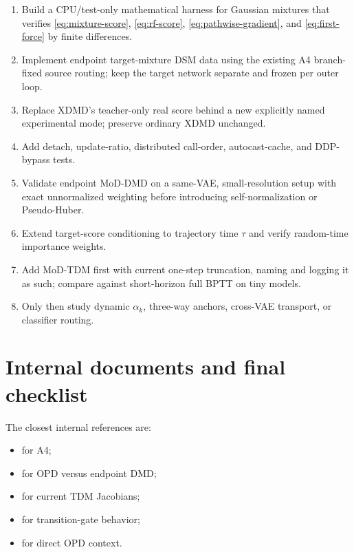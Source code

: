 \documentclass[11pt,a4paper]{article}
\theoremstyle{plain}
\theoremstyle{definition}
\begin{document}
\begin{enumerate}[leftmargin=1.6em]
\item Build a CPU/test-only mathematical harness for Gaussian mixtures that verifies
      \eqref{eq:mixture-score}, \eqref{eq:rf-score}, \eqref{eq:pathwise-gradient}, and
      \eqref{eq:first-force} by finite differences.
\item Implement endpoint target-mixture DSM data using the existing A4 branch-fixed source
      routing; keep the target network separate and frozen per outer loop.
\item Replace XDMD's teacher-only real score behind a new explicitly named experimental mode;
      preserve ordinary XDMD unchanged.
\item Add detach, update-ratio, distributed call-order, autocast-cache, and DDP-bypass tests.
\item Validate endpoint MoD-DMD on a same-VAE, small-resolution setup with exact unnormalized
      weighting before introducing self-normalization or Pseudo-Huber.
\item Extend target-score conditioning to trajectory time $\tau$ and verify random-time importance
      weights.
\item Add MoD-TDM first with current one-step truncation, naming and logging it as such; compare
      against short-horizon full BPTT on tiny models.
\item Only then study dynamic $\alpha_k$, three-way anchors, cross-VAE transport, or classifier
      routing.
\end{enumerate}

\section{Internal documents and final checklist}
\label{sec:references}

The closest internal references are:
\begin{itemize}[leftmargin=1.5em]
\item \href{run:../core/marginal_cfm/arm_a4_marginal_mixture_cfm_tutorial.pdf}
      {} for A4;
\item \href{run:../xdmd/dmd_opd_gradient_relation.pdf}
      {} for OPD versus endpoint DMD;
\item \href{run:../trajectory_dm/tdm_opd_dm_gradient_relation.tex}
      {} for current TDM Jacobians;
\item \href{run:../core/p_opd/popd_exact_sum_gate_saturation.pdf}
      {} for transition-gate behavior;
\item \href{run:../flow_direct_opd/flow_direct_opd_small_rl_delta_transfer.pdf}
      {} for direct OPD context.
\end{itemize}
\end{document}
